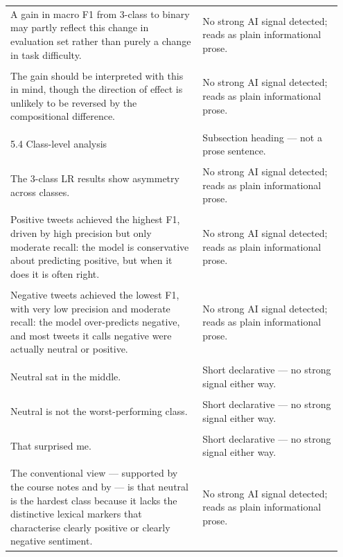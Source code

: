 \documentclass[11pt]{article}
\begin{document}
\begin{longtable}{|p{0.55\linewidth}|p{0.40\linewidth}|}
\hline
\rule{0pt}{3.5cm} & \\
\hline
A gain in macro F1 from 3-class to binary may partly reflect this change in evaluation set rather than purely a change in task difficulty. & No strong AI signal detected; reads as plain informational prose. \\[2pt]
\hline
\rule{0pt}{3.5cm} & \\
\hline
The gain should be interpreted with this in mind, though the direction of effect is unlikely to be reversed by the compositional difference. & No strong AI signal detected; reads as plain informational prose. \\[2pt]
\hline
\rule{0pt}{3.5cm} & \\
\hline
5.4 Class-level analysis & Subsection heading --- not a prose sentence. \\[2pt]
\hline
\rule{0pt}{3.5cm} & \\
\hline
The 3-class LR results show asymmetry across classes. & No strong AI signal detected; reads as plain informational prose. \\[2pt]
\hline
\rule{0pt}{3.5cm} & \\
\hline
Positive tweets achieved the highest F1, driven by high precision but only moderate recall: the model is conservative about predicting positive, but when it does it is often right. & No strong AI signal detected; reads as plain informational prose. \\[2pt]
\hline
\rule{0pt}{3.5cm} & \\
\hline
Negative tweets achieved the lowest F1, with very low precision and moderate recall: the model over-predicts negative, and most tweets it calls negative were actually neutral or positive. & No strong AI signal detected; reads as plain informational prose. \\[2pt]
\hline
\rule{0pt}{3.5cm} & \\
\hline
Neutral sat in the middle. & Short declarative --- no strong signal either way. \\[2pt]
\hline
\rule{0pt}{3.5cm} & \\
\hline
Neutral is not the worst-performing class. & Short declarative --- no strong signal either way. \\[2pt]
\hline
\rule{0pt}{3.5cm} & \\
\hline
That surprised me. & Short declarative --- no strong signal either way. \\[2pt]
\hline
\rule{0pt}{3.5cm} & \\
\hline
The conventional view --- supported by the course notes and by --- is that neutral is the hardest class because it lacks the distinctive lexical markers that characterise clearly positive or clearly negative sentiment. & No strong AI signal detected; reads as plain informational prose. \\[2pt]

\end{longtable}
\end{document}
